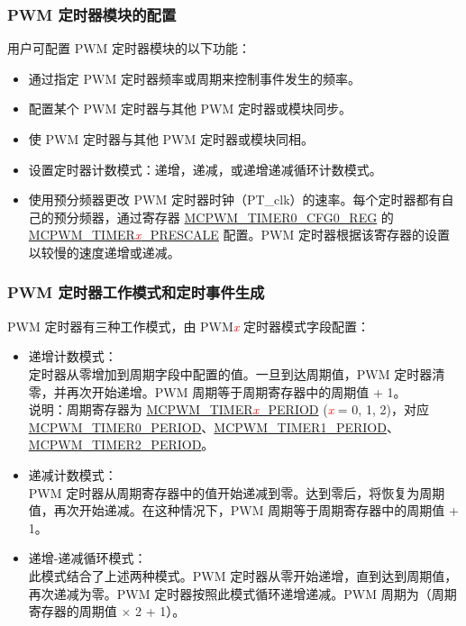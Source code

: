 \documentclass[main\_\_CN.tex]{subfiles}
\begin{document}
\subsubsection{PWM 定时器模块的配置 }
用户可配置 PWM 定时器模块的以下功能：

\begin{itemize}
    \item 通过指定 PWM 定时器频率或周期来控制事件发生的频率。
    \item 配置某个 PWM 定时器与其他 PWM 定时器或模块同步。
    \item 使 PWM 定时器与其他 PWM 定时器或模块同相。
    \item 设置定时器计数模式：递增，递减，或递增递减循环计数模式。
    \item 使用预分频器更改 PWM 定时器时钟（PT\_clk）的速率。每个定时器都有自己的预分频器，通过寄存器 \hyperref[regdesc:MCPWMTIMER0CFG0REG]{MCPWM\_TIMER0\_CFG0\_REG} 的 \hyperref[fielddesc:MCPWMTIMER0PRESCALE]{MCPWM\_TIMER\textcolor{red}{\it{x}}\_PRESCALE} 配置。PWM 定时器根据该寄存器的设置以较慢的速度递增或递减。
\end{itemize}

\subsubsection{PWM 定时器工作模式和定时事件生成}

PWM 定时器有三种工作模式，由 PWM\textcolor{red}{\it{x}} 定时器模式字段配置：

\begin{itemize}
    \item 递增计数模式：\\
    定时器从零增加到周期字段中配置的值。一旦到达周期值，PWM 定时器清零，并再次开始递增。PWM 周期等于周期寄存器中的周期值 + 1。\\
    说明：周期寄存器为 \hyperref[fielddesc:MCPWMTIMER0PERIOD]{MCPWM\_TIMER\textcolor{red}{\it{x}}\_PERIOD} (\textcolor{red}{\it{x}} = 0, 1, 2)，对应\\ \hyperref[fielddesc:MCPWMTIMER0PERIOD]{MCPWM\_TIMER0\_PERIOD}、\hyperref[fielddesc:MCPWMTIMER1PERIOD]{MCPWM\_TIMER1\_PERIOD}、\hyperref[fielddesc:MCPWMTIMER2PERIOD]{MCPWM\_TIMER2\_PERIOD}。
    \item 递减计数模式：\\
    PWM 定时器从周期寄存器中的值开始递减到零。达到零后，将恢复为周期值，再次开始递减。在这种情况下，PWM 周期等于周期寄存器中的周期值 + 1。
    \item 递增-递减循环模式：\\
    此模式结合了上述两种模式。PWM 定时器从零开始递增，直到达到周期值，再次递减为零。PWM 定时器按照此模式循环递增递减。PWM 周期为（周期寄存器的周期值 × 2 + 1）。
\end{itemize}
\end{document}
